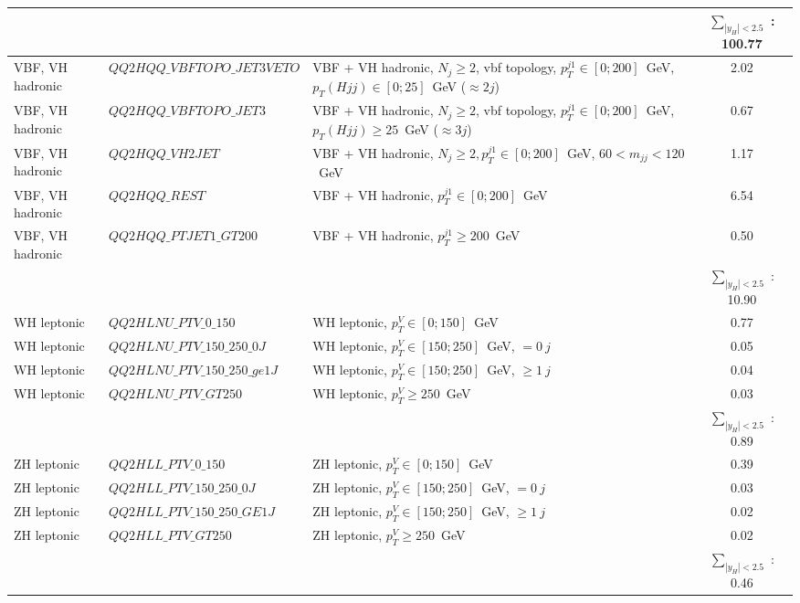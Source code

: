 \begin{enumerate}
\begin{table}[h!]
{\begin{tabular}{|l|l|l|c|}
\hline
\multicolumn{3}{|c|}{}                                         &$\sum_{|y_H|<2.5}$ :    100.77\\
\hline
\hline
VBF, VH hadronic  &$QQ2HQQ\_VBFTOPO\_JET3VETO$  &VBF + VH hadronic, $N_j \ge 2$, vbf topology, $p_T^{j1} \in [0 ; 200]$~GeV, $p_T(Hjj)\in [0 ; 25]$~GeV ($\approx 2j$) &2.02\\
\hline
VBF, VH hadronic  &$QQ2HQQ\_VBFTOPO\_JET3$      &VBF + VH hadronic, $N_j \ge 2$, vbf topology, $p_T^{j1} \in [0 ; 200]$~GeV, $p_T(Hjj) \ge  25$~GeV ($\approx 3j$) &0.67\\
\hline
VBF, VH hadronic  &$QQ2HQQ\_VH2JET$             &VBF + VH hadronic, $N_j \ge 2, p_T^{j1} \in [0 ; 200]$~GeV, $60<m_{jj}<120$~GeV &1.17\\
\hline
VBF, VH hadronic  &$QQ2HQQ\_REST$               &VBF + VH hadronic, $p_T^{j1} \in [0 ; 200]$~GeV &6.54\\
\hline
VBF, VH hadronic  &$QQ2HQQ\_PTJET1\_GT200$      &VBF + VH hadronic, $p_T^{j1} \ge 200$~GeV &0.50\\
\hline
\multicolumn{3}{|c|}{}                                         &$\sum_{|y_H|<2.5}$ : 10.90\\
\hline
\hline
WH leptonic       &$QQ2HLNU\_PTV\_0\_150$        &WH leptonic, $p_T^V\in [0 ; 150]$~GeV &0.77\\
\hline
WH leptonic       &$QQ2HLNU\_PTV\_150\_250\_0J$ &WH leptonic, $p_T^V\in [150 ; 250]$~GeV, $=0\ j$ &0.05\\
\hline
WH leptonic       &$QQ2HLNU\_PTV\_150\_250\_ge1J$ &WH leptonic, $p_T^V\in [150 ; 250]$~GeV, $\ge 1\ j$ &0.04\\
\hline
WH leptonic       &$QQ2HLNU\_PTV\_GT250$          &WH leptonic, $p_T^V\ge 250$~GeV &0.03\\
\hline
\multicolumn{3}{|c|}{}                                         &$\sum_{|y_H|<2.5}$ : 0.89\\
\hline
\hline
ZH leptonic       &$QQ2HLL\_PTV\_0\_150$        &ZH leptonic, $p_T^V\in [0 ; 150]$~GeV &0.39\\
\hline
ZH leptonic       &$QQ2HLL\_PTV\_150\_250\_0J$ &ZH leptonic, $p_T^V\in [150 ; 250]$~GeV, $=0\ j$ &0.03\\
\hline
ZH leptonic       &$QQ2HLL\_PTV\_150\_250\_GE1J$ &ZH leptonic, $p_T^V\in [150 ; 250]$~GeV, $\ge 1\ j$ &0.02\\
\hline
ZH leptonic       &$QQ2HLL\_PTV\_GT250$          &ZH leptonic, $p_T^V\ge 250$~GeV &0.02\\
\hline
\multicolumn{3}{|c|}{}                                         &$\sum_{|y_H|<2.5}$ : 0.46\\

\end{tabular}}
\end{table}
\end{enumerate}
